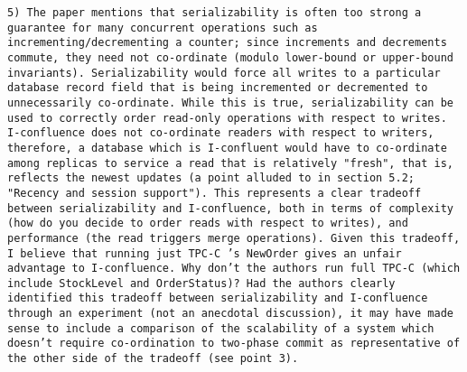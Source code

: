 \documentclass[10pt]{article}
\newcommand{\reviewer}[1] {\noindent\colorbox{reviewercolor}{\parbox{\textwidth}{\noindent\texttt{#1}}}\\}
\begin{document}
\reviewer{5) The paper mentions that serializability is often too
  strong a guarantee for many concurrent operations such as
  incrementing/decrementing a counter; since increments and decrements
  commute, they need not co-ordinate (modulo lower-bound or
  upper-bound invariants). Serializability would force all writes to a
  particular database record field that is being incremented or
  decremented to unnecessarily co-ordinate. While this is true,
  serializability can be used to correctly order read-only operations
  with respect to writes. I-confluence does not co-ordinate readers
  with respect to writers, therefore, a database which is I-confluent
  would have to co-ordinate among replicas to service a read that is
  relatively "fresh", that is, reflects the newest updates (a point
  alluded to in section 5.2; "Recency and session support"). This
  represents a clear tradeoff between serializability and
  I-confluence, both in terms of complexity (how do you decide to
  order reads with respect to writes), and performance (the read
  triggers merge operations). Given this tradeoff, I believe that
  running just TPC-C 's NewOrder gives an unfair advantage to
  I-confluence. Why don't the authors run full TPC-C (which include
  StockLevel and OrderStatus)? Had the authors clearly identified this
  tradeoff between serializability and I-confluence through an
  experiment (not an anecdotal discussion), it may have made sense to
  include a comparison of the scalability of a system which doesn't
  require co-ordination to two-phase commit as representative of the
  other side of the tradeoff (see point 3). }
\end{document}
